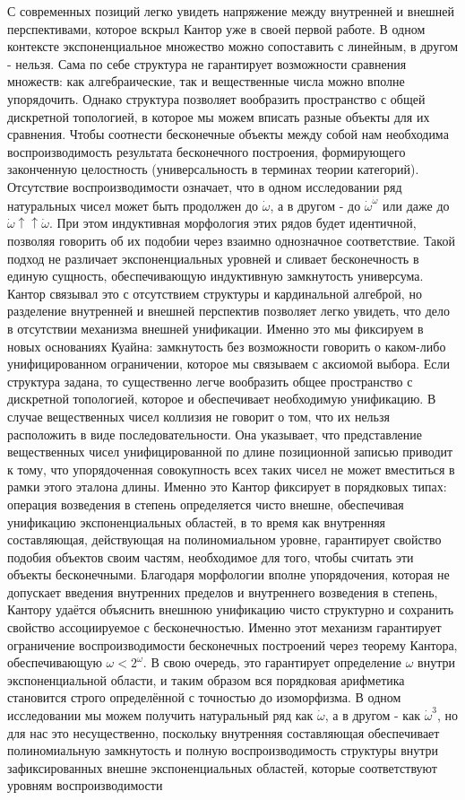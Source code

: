 \documentclass[12pt]{article}
\begin{document}
С современных позиций легко увидеть напряжение между внутренней и внешней перспективами, которое вскрыл Кантор уже в своей первой работе. В одном контексте экспоненциальное множество можно сопоставить с линейным, в другом - нельзя. Сама по себе структура не гарантирует возможности сравнения множеств: как алгебраические, так и вещественные числа можно вполне упорядочить. Однако структура позволяет вообразить пространство с общей дискретной топологией, в которое мы можем вписать разные объекты для их сравнения. Чтобы соотнести бесконечные объекты между собой нам необходима воспроизводимость результата бесконечного построения, формирующего законченную целостность (универсальность в терминах теории категорий). Отсутствие воспроизводимости означает, что в одном исследовании ряд натуральных чисел может быть продолжен до $\dot{\omega}$, а в другом - до $\dot{\omega}^{\dot{\omega}}$ или даже до $\dot{\omega} \uparrow\uparrow \dot{\omega}$. При этом индуктивная морфология этих рядов будет идентичной, позволяя говорить об их подобии через взаимно однозначное соответствие. Такой подход не различает экспоненциальных уровней и сливает бесконечность в единую сущность, обеспечивающую индуктивную замкнутость универсума. Кантор связывал это с отсутствием структуры и кардинальной алгеброй, но разделение внутренней и внешней перспектив позволяет легко увидеть, что дело в отсутствии механизма внешней унификации. Именно это мы фиксируем в новых основаниях Куайна: замкнутость без возможности говорить о каком-либо унифицированном ограничении, которое мы связываем с аксиомой выбора. Если структура задана, то существенно легче вообразить общее пространство с дискретной топологией, которое и обеспечивает необходимую унификацию. В случае вещественных чисел коллизия не говорит о том, что их нельзя расположить в виде последовательности. Она указывает, что представление вещественных чисел унифицированной по длине позиционной записью приводит к тому, что упорядоченная совокупность всех таких чисел не может вместиться в рамки этого эталона длины. Именно это Кантор фиксирует в порядковых типах: операция возведения в степень определяется чисто внешне, обеспечивая унификацию экспоненциальных областей, в то время как внутренняя составляющая, действующая на полиномиальном уровне, гарантирует свойство подобия объектов своим частям, необходимое для того, чтобы считать эти объекты бесконечными. Благодаря морфологии вполне упорядочения, которая не допускает введения внутренних пределов и внутреннего возведения в степень, Кантору удаётся объяснить внешнюю унификацию чисто структурно и сохранить свойство ассоциируемое с бесконечностью. Именно этот механизм гарантирует ограничение воспроизводимости бесконечных построений через теорему Кантора, обеспечивающую $\omega < 2^\omega$. В свою очередь, это гарантирует определение $\omega$ внутри экспоненциальной области, и таким образом вся порядковая арифметика становится строго определённой с точностью до изоморфизма. В одном исследовании мы можем получить натуральный ряд как $\dot{\omega}$, а в другом - как $\dot{\omega}^3$, но для нас это несущественно, поскольку внутренняя составляющая обеспечивает полиномиальную замкнутость и полную воспроизводимость структуры внутри зафиксированных внешне экспоненциальных областей, которые соответствуют уровням воспроизводимости 
\end{document}
